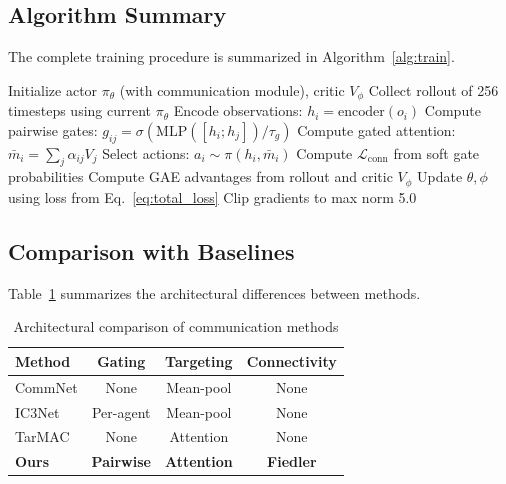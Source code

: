 \documentclass[letterpaper, 10 pt, journal, twoside]{IEEEtran}
\begin{document}
\subsection{Algorithm Summary}

The complete training procedure is summarized in Algorithm~\ref{alg:train}.

\begin{algorithm}[h]
\caption{PPO Training with Connectivity Constraint}
\label{alg:train}
\begin{algorithmic}[1]
\STATE Initialize actor $\pi_\theta$ (with communication module), critic $V_\phi$
  \STATE Collect rollout of 256 timesteps using current $\pi_\theta$
    \STATE Encode observations: $h_i = \text{encoder}(o_i)$
    \STATE Compute pairwise gates: $g_{ij} = \sigma(\text{MLP}([h_i; h_j])/\tau_g)$
    \STATE Compute gated attention: $\bar{m}_i = \sum_j \alpha_{ij} V_j$
    \STATE Select actions: $a_i \sim \pi(h_i, \bar{m}_i)$
    \STATE Compute $\mathcal{L}_{\text{conn}}$ from soft gate probabilities
  \ENDFOR
  \STATE Compute GAE advantages from rollout and critic $V_\phi$
    \STATE Update $\theta, \phi$ using loss from Eq.~\ref{eq:total_loss}
    \STATE Clip gradients to max norm 5.0
  \ENDFOR
\ENDFOR
\end{algorithmic}
\end{algorithm}

\subsection{Comparison with Baselines}

Table~\ref{tab:compare} summarizes the architectural differences between methods.

\begin{table}[h]
\centering
\caption{Architectural comparison of communication methods}
\label{tab:compare}
\begin{tabular}{lccc}
\toprule
\textbf{Method} & \textbf{Gating} & \textbf{Targeting} & \textbf{Connectivity} \\
\midrule
CommNet & None & Mean-pool & None \\
IC3Net & Per-agent & Mean-pool & None \\
TarMAC & None & Attention & None \\
\textbf{Ours} & \textbf{Pairwise} & \textbf{Attention} & \textbf{Fiedler} \\
\bottomrule
\end{tabular}
\end{table}
\end{document}
